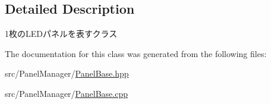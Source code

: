 \subsection{Detailed Description}
1枚の\+L\+E\+Dパネルを表すクラス 

The documentation for this class was generated from the following files\+:\begin{DoxyCompactItemize}
\item 
src/\+Panel\+Manager/\hyperlink{PanelBase_8hpp}{Panel\+Base.\+hpp}\item 
src/\+Panel\+Manager/\hyperlink{PanelBase_8cpp}{Panel\+Base.\+cpp}\end{DoxyCompactItemize}
